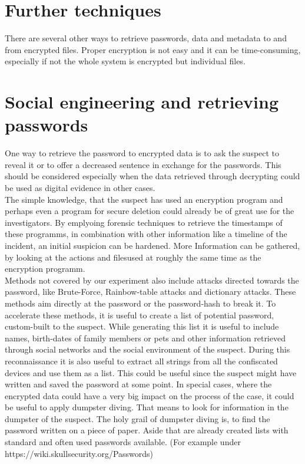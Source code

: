 \section{Further techniques}
There are several other ways to retrieve passwords, data and metadata to
and from encrypted files. Proper encryption is not easy and it can be 
time-consuming, especially if not the whole system is encrypted but 
individual files.\\
\section{Social engineering and retrieving passwords}
One way to retrieve the password to encrypted data is to ask the suspect
to reveal it or to offer a decreased sentence in exchange for the passwords.
This should be considered especially when the data retrieved through decrypting could be used as digital 
evidence in other cases.\\
The simple knowledge, that the suspect has used an encryption program and
perhaps even a program for secure deletion could already be of great use for the
investigators. By emplyoing forensic techniques to retrieve the timestamps 
of these programms, in combination with other information like a timeline
of the incident, an initial suspicion can be hardened. More Information can be
gathered, by looking at the actions and filesused at roughly the same time as the encryption programm.\\
Methods not covered by our experiment also include attacks directed towards 
the password, like Brute-Force, Rainbow-table attacks and dictionary attacks.
These methods aim directly at the password or the password-hash to break it.
To accelerate these methods, it is useful to create a list of potential
password, custom-built to the suspect. While generating this list it is useful 
to include names, birth-dates of family members or pets and
other information retrieved through social networks and the social 
environment of the suspect.
During this reconnaissance it is also useful to extract all strings from all
the confiscated devices and use them as a list. This could be useful since
the suspect might have written and saved the password at some point.
In special cases, where the encrypted data could have a very big impact on the
process of the case, it could be useful to apply dumpster diving. 
That means to look for information in the dumpster of the suspect.
The holy grail of dumpster diving is, to find the password written on a piece
of paper.
Aside that are already created lists with standard and often used passwords
available.
(For example under https://wiki.skullsecurity.org/Passwords)

